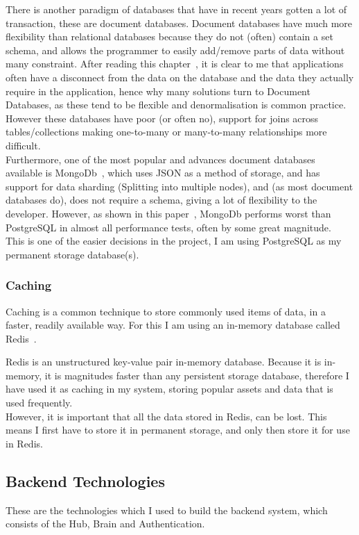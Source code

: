 \documentclass[titlepage]{article}
\begin{document}
There is another paradigm of databases that have in recent years gotten a lot of transaction, these are document databases. Document databases have much more flexibility than relational databases because they do not (often) contain a set schema, and allows the programmer to easily add/remove parts of data without many constraint. After reading this chapter~\cite{relational_vs_document}, it is clear to me that applications often have a disconnect from the data on the database and the data they actually require in the application, hence why many solutions turn to Document Databases, as these tend to be flexible and denormalisation is common practice. However these databases have poor (or often no), support for joins across tables/collections making one-to-many or many-to-many relationships more difficult. \\

Furthermore, one of the most popular and advances document databases available is MongoDb~\cite{mongodb}, which uses JSON as a method of storage, and has support for data sharding (Splitting into multiple nodes), and (as most document databases do), does not require a schema, giving a lot of flexibility to the developer. However, as shown in this paper~\cite{mongo_vs_postgres}, MongoDb performs worst than PostgreSQL in almost all performance tests, often by some great magnitude. \\

This is one of the easier decisions in the project, I am using PostgreSQL as my permanent storage database(s).

\subsubsection{Caching}
Caching is a common technique to store commonly used items of data, in a faster, readily available way. For this I am using an in-memory database called Redis~\cite{redis}.

Redis is an unstructured key-value pair in-memory database. Because it is in-memory, it is magnitudes faster than any persistent storage database, therefore I have used it as caching in my system, storing popular assets and data that is used frequently. \\
However, it is important that all the data stored in Redis, can be lost. This means I first have to store it in permanent storage, and only then store it for use in Redis. \\

\subsection{Backend Technologies}
These are the technologies which I used to build the backend system, which consists of the Hub, Brain and Authentication. \\
\end{document}
